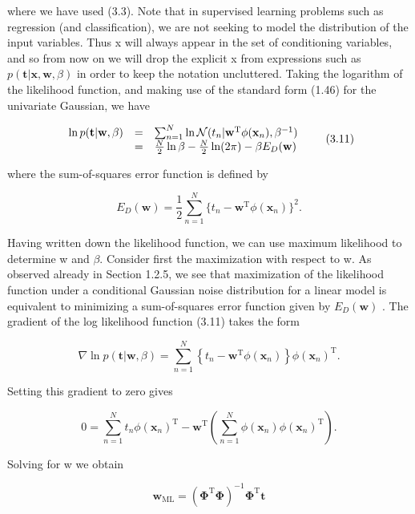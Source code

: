 \documentclass[
  10
]{article}
\begin{document}
where we have used (3.3). Note that in supervised learning problems such
as regression (and classification), we are not seeking to model the
distribution of the input variables. Thus x will always appear in the
set of conditioning variables, and so from now on we will drop the
explicit x from expressions such as
\(p ( \mathbf { t } | \mathbf { x } , \mathbf { w } , \beta )\) in order
to keep the notation uncluttered. Taking the logarithm of the likelihood
function, and making use of the standard form (1.46) for the univariate
Gaussian, we have

\[
\begin{array}{r c l} \ln p (\mathbf {t} | \mathbf {w}, \beta) & = & \sum_ {n = 1} ^ {N} \ln \mathcal {N} (t _ {n} | \mathbf {w} ^ {\mathrm{T}} \phi (\mathbf {x} _ {n}), \beta^ {- 1}) \\ & = & \frac {N}{2} \ln \beta - \frac {N}{2} \ln (2 \pi) - \beta E _ {D} (\mathbf {w}) \end{array}\tag{3.11}
\]

where the sum-of-squares error function is defined by

\[
E _ {D} (\mathbf {w}) = \frac {1}{2} \sum_ {n = 1} ^ {N} \{t _ {n} - \mathbf {w} ^ {\mathrm{T}} \phi (\mathbf {x} _ {n}) \} ^ {2}.\tag{3.12}
\]

Having written down the likelihood function, we can use maximum
likelihood to determine w and \(\beta .\) Consider first the
maximization with respect to w. As observed already in Section 1.2.5, we
see that maximization of the likelihood function under a conditional
Gaussian noise distribution for a linear model is equivalent to
minimizing a sum-of-squares error function given by
\(E _ { D } ( \mathbf { w } )\) . The gradient of the log likelihood
function (3.11) takes the form

\[
\nabla \ln p (\mathbf {t} | \mathbf {w}, \beta) = \sum_ {n = 1} ^ {N} \left\{t _ {n} - \mathbf {w} ^ {\mathrm{T}} \phi (\mathbf {x} _ {n}) \right\} \phi (\mathbf {x} _ {n}) ^ {\mathrm{T}}.\tag{3.13}
\]

Setting this gradient to zero gives

\[
0 = \sum_ {n = 1} ^ {N} t _ {n} \phi (\mathbf {x} _ {n}) ^ {\mathrm{T}} - \mathbf {w} ^ {\mathrm{T}} \left(\sum_ {n = 1} ^ {N} \phi (\mathbf {x} _ {n}) \phi (\mathbf {x} _ {n}) ^ {\mathrm{T}}\right).\tag{3.14}
\]

Solving for w we obtain

\[
\mathbf {w} _ {\mathrm{ML}} = \left(\boldsymbol {\Phi} ^ {\mathrm{T}} \boldsymbol {\Phi}\right) ^ {- 1} \boldsymbol {\Phi} ^ {\mathrm{T}} \mathbf {t}\tag{3.15}
\]
\end{document}
